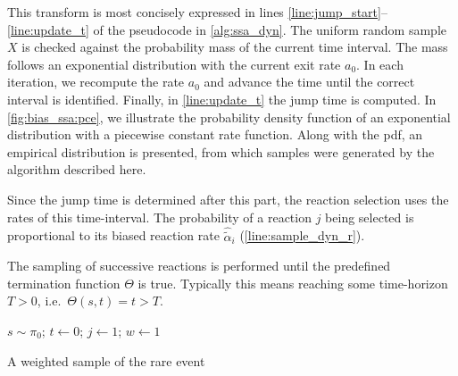 This transform is most concisely expressed in lines \ref{line:jump_start}--\ref{line:update_t} of the pseudocode in \autoref{alg:ssa_dyn}.
The uniform random sample $X$ is checked against the probability mass of the current time interval.
The mass follows an exponential distribution with the current exit rate $a_0$.
In each iteration, we recompute the rate $a_0$ and advance the time until the correct interval is identified.
Finally, in \autoref{line:update_t} the jump time is computed.
In \autoref{fig:bias_ssa:pce}, we illustrate the probability density function of an exponential distribution with a piecewise constant rate function.
Along with the pdf, an empirical distribution is presented, from which samples were generated by the algorithm described here.

Since the jump time is determined after this part, the reaction selection uses the rates of this time-interval.
The probability of a reaction $j$ being selected is proportional to its biased reaction rate $\hat{\tilde{\alpha}}_{i}$ (\autoref{line:sample_dyn_r}).

The sampling of successive reactions is performed until the predefined termination function $\Theta$ is true.
Typically this means reaching some time-horizon $T>0$, i.e.\ $\Theta(s, t)=t>T$.
\begin{algorithm}
    $s\sim\pi_0$; $t\leftarrow 0$; $j\leftarrow 1$; $w\leftarrow 1$\;
    \caption{\label{alg:ssa_dyn}A weighted sample of the rare event}
\end{algorithm}


